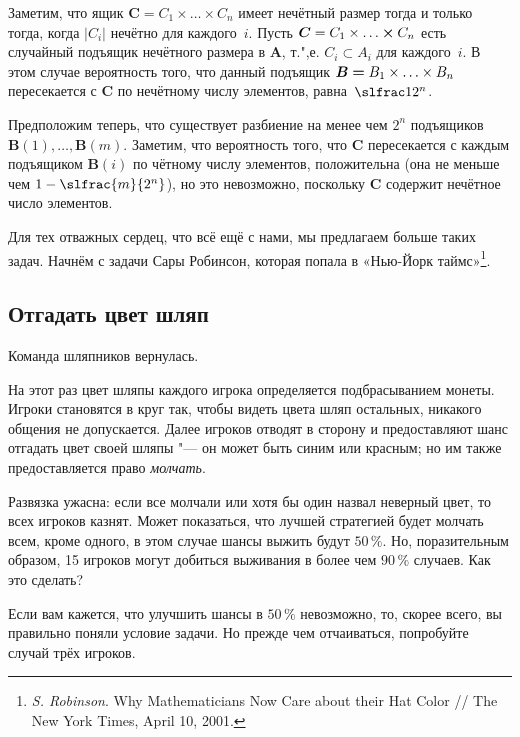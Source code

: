 \documentclass[twoside]{book}
\makeatletter
\newcommand{\rindex}[2][\imki@jobname]{%
  \index[#1]{\detokenize{#2}}%
}
\makeatother
\begin{document}
Заметим, что ящик $\bm{C}=C_1 \times\ldots\times C_n$ имеет нечётный размер тогда и только тогда, когда $|C_i|$ нечётно для каждого~$i$.
Пусть $\bm{C}=C_1 \times \ldots \hm\times C_n$ есть случайный подъящик нечётного размера в $\bm{A}$, т.",е. $C_i\subset A_i$ для каждого~$i$.
В этом случае вероятность того, что данный подъящик $\bm{B}\hm=B_1\times\ldots\times B_n$ пересекается с $\bm{C}$ по нечётному числу элементов, равна~$\slfrac1{2^n}$.

Предположим теперь, что существует разбиение на менее чем $2^n$ подъящиков $\bm{B}(1),\dots,\bm{B}(m)$.
Заметим, что вероятность того, что $\bm{C}$ пересекается с каждым подъящиком $\bm{B}(i)$ по чётному числу элементов, положительна (она не меньше чем $1-\slfrac{m}{2^n}$),
но это невозможно, поскольку $\bm{C}$ содержит нечётное число элементов.
\heart

Для тех отважных сердец, что всё ещё с нами, мы предлагаем больше таких задач.
Начнём с задачи Сары Робинсон, которая попала в «Нью-Йорк таймс»\footnote{\emph{S. Robinson}. Why Mathematicians Now Care about their Hat Color /\!/ {The New York Times}, April 10, 2001.}.

\subsection*{Отгадать цвет шляп}
\rindex{Отгадать цвет шляп}

Команда шляпников вернулась.

На этот раз цвет шляпы каждого игрока определяется подбрасыванием монеты.
Игроки становятся в круг так, чтобы видеть цвета шляп остальных, никакого общения не допускается.
Далее игроков отводят в сторону и предоставляют шанс отгадать цвет своей шляпы "--- он может быть синим или красным;
но им также предоставляется право \emph{молчать}.

Развязка ужасна: если все молчали или хотя бы один назвал неверный цвет, то всех игроков казнят.
Может показаться, что лучшей стратегией будет молчать всем, кроме одного, в этом случае шансы выжить будут $50\,\%$.
Но, поразительным образом, 15 %
игроков могут добиться выживания в более чем $90\,\%$ случаев. 
Как это сделать?

Если вам кажется, что улучшить шансы в $50\,\%$ невозможно, то, скорее всего, вы правильно поняли условие задачи.
Но прежде чем отчаиваться, попробуйте случай трёх игроков.

\medskip 
\end{document}
